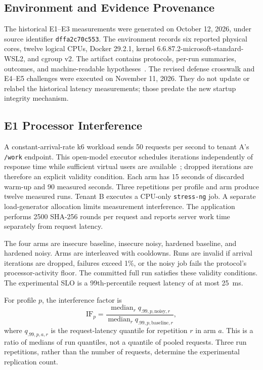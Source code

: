 \documentclass[conference,letterpaper]{IEEEtran}
\newcommand{\code}[1]{\texttt{#1}}
\begin{document}
\subsection{Environment and Evidence Provenance}
The historical E1--E3 measurements were generated on October 12, 2026, under source identifier \code{dffa2c70c553}. The environment records six reported physical cores, twelve logical CPUs, Docker 29.2.1, kernel 6.6.87.2-microsoft-standard-WSL2, and cgroup v2. The artifact contains protocols, per-run summaries, outcomes, and machine-readable hypotheses~\cite{artifact}. The revised defense crosswalk and E4--E5 challenges were executed on November 11, 2026. They do not update or relabel the historical latency measurements; those predate the new startup integrity mechanism.

\subsection{E1 Processor Interference}
A constant-arrival-rate k6 workload sends 50 requests per second to tenant A's \code{/work} endpoint. This open-model executor schedules iterations independently of response time while sufficient virtual users are available~\cite{k6}; dropped iterations are therefore an explicit validity condition. Each arm has 15 seconds of discarded warm-up and 90 measured seconds. Three repetitions per profile and arm produce twelve measured runs. Tenant B executes a CPU-only \code{stress-ng} job. A separate load-generator allocation limits measurement interference. The application performs 2500 SHA-256 rounds per request and reports server work time separately from request latency.

The four arms are insecure baseline, insecure noisy, hardened baseline, and hardened noisy. Arms are interleaved with cooldowns. Runs are invalid if arrival iterations are dropped, failures exceed 1\%, or the noisy job fails the protocol's processor-activity floor. The committed full run satisfies these validity conditions. The experimental SLO is a 99th-percentile request latency of at most 25~ms.

For profile $p$, the interference factor is
\begin{equation}
\mathrm{IF}_{p}=\frac{\operatorname{median}_{r} q_{.99,p,\mathrm{noisy},r}}
{\operatorname{median}_{r} q_{.99,p,\mathrm{baseline},r}},
\label{eq:if}
\end{equation}
where $q_{.99,p,a,r}$ is the request-latency quantile for repetition $r$ in arm $a$. This is a ratio of medians of run quantiles, not a quantile of pooled requests. Three run repetitions, rather than the number of requests, determine the experimental replication count.
\end{document}
